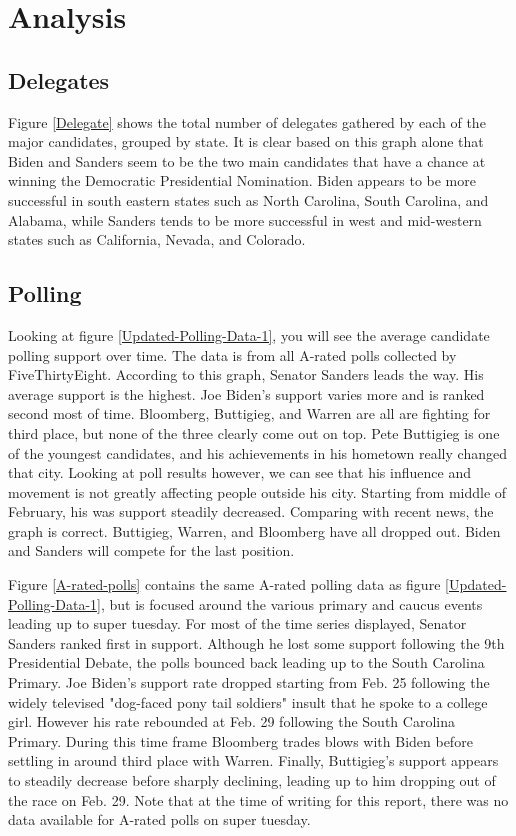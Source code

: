\section{Analysis}\label{analysis}

\subsection{Delegates}

Figure \ref{Delegate} shows the total number of delegates gathered by each of the major candidates, grouped by state. It is clear based on this graph alone that Biden and Sanders seem to be the two main candidates that have a chance at winning the Democratic Presidential Nomination. Biden appears to be more successful in south eastern states such as North Carolina, South Carolina, and Alabama, while Sanders tends to be more successful in west and mid-western states such as California, Nevada, and Colorado.

\subsection{Polling}

Looking at figure \ref{Updated-Polling-Data-1}, you will see the average candidate polling support over time. The data is from all A-rated polls collected by FiveThirtyEight. According to this graph, Senator Sanders leads the way. His average support is the highest. Joe Biden's support varies more and is ranked second most of time. Bloomberg, Buttigieg, and Warren are all are fighting for third place, but none of the three clearly come out on top. Pete Buttigieg is one of the youngest candidates, and his achievements in his hometown really changed that city. Looking at poll results however, we can see that his influence and movement is not greatly affecting people outside his city. Starting from middle of February, his was support steadily decreased. Comparing with recent news, the graph is correct. Buttigieg, Warren, and Bloomberg have all dropped out. Biden and Sanders will compete for the last position.

Figure \ref{A-rated-polls} contains the same A-rated polling data as figure \ref{Updated-Polling-Data-1}, but is focused around the various primary and caucus events leading up to super tuesday. For most of the time series displayed, Senator Sanders ranked first in support. Although he lost some support following the 9th Presidential Debate, the polls bounced back leading up to the South Carolina Primary. Joe Biden's support rate dropped starting from Feb. 25 following the widely televised "dog-faced pony tail soldiers" insult that he spoke to a college girl. However his rate rebounded at Feb. 29 following the South Carolina Primary. During this time frame Bloomberg trades blows with Biden before settling in around third place with Warren. Finally, Buttigieg's support appears to steadily decrease before sharply declining, leading up to him dropping out of the race on Feb. 29. Note that at the time of writing for this report, there was no data available for A-rated polls on super tuesday.

